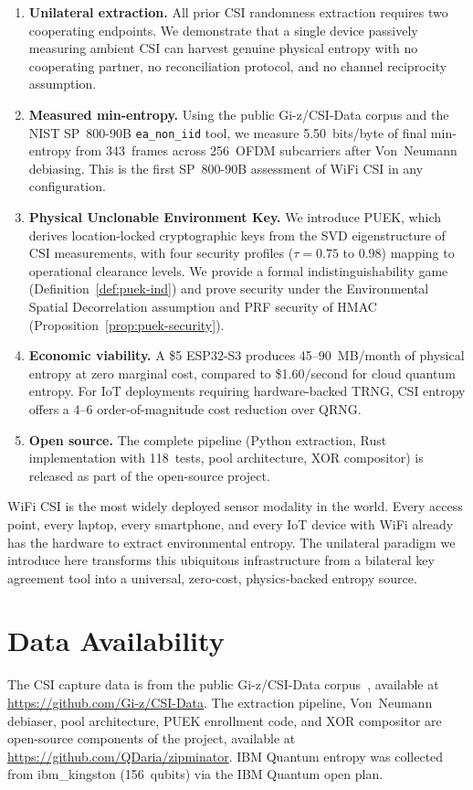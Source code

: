 \begin{enumerate}
\item \textbf{Unilateral extraction.}
All prior CSI randomness extraction requires two cooperating endpoints.
We demonstrate that a single device passively measuring ambient CSI can harvest genuine physical entropy with no cooperating partner, no reconciliation protocol, and no channel reciprocity assumption.

\item \textbf{Measured min-entropy.}
Using the public Gi-z/CSI-Data corpus and the NIST SP~800-90B \texttt{ea\_non\_iid} tool, we measure 5.50~bits/byte of final min-entropy from 343~frames across 256~OFDM subcarriers after Von~Neumann debiasing.
This is the first SP~800-90B assessment of WiFi CSI in any configuration.

\item \textbf{Physical Unclonable Environment Key.}
We introduce PUEK, which derives location-locked cryptographic keys from the SVD eigenstructure of CSI measurements, with four security profiles ($\tau = 0.75$ to $0.98$) mapping to operational clearance levels.
We provide a formal indistinguishability game (Definition~\ref{def:puek-ind}) and prove security under the Environmental Spatial Decorrelation assumption and PRF security of HMAC (Proposition~\ref{prop:puek-security}).

\item \textbf{Economic viability.}
A \$5 ESP32-S3 produces 45--90~MB/month of physical entropy at zero marginal cost, compared to \$1.60/second for cloud quantum entropy.
For IoT deployments requiring hardware-backed TRNG, CSI entropy offers a 4--6 order-of-magnitude cost reduction over QRNG.

\item \textbf{Open source.}
The complete pipeline (Python extraction, Rust implementation with 118~tests, pool architecture, XOR compositor) is released as part of the \zipminator open-source project.
\end{enumerate}

WiFi CSI is the most widely deployed sensor modality in the world.
Every access point, every laptop, every smartphone, and every IoT device with WiFi already has the hardware to extract environmental entropy.
The unilateral paradigm we introduce here transforms this ubiquitous infrastructure from a bilateral key agreement tool into a universal, zero-cost, physics-backed entropy source.

\section*{Data Availability}
The CSI capture data is from the public Gi-z/CSI-Data corpus~\cite{gringoli2019csidata}, available at \url{https://github.com/Gi-z/CSI-Data}.
The extraction pipeline, Von~Neumann debiaser, pool architecture, PUEK enrollment code, and XOR compositor are open-source components of the \zipminator project, available at \url{https://github.com/QDaria/zipminator}.
IBM Quantum entropy was collected from ibm\_kingston (156~qubits) via the IBM Quantum open plan.

